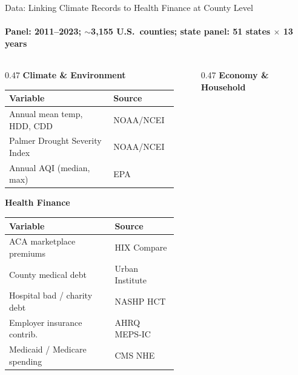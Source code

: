 \documentclass[aspectratio=169,11pt]{beamer}
\newcommand{\tealtext}[1]{{\color{Teal}#1}}
\begin{document}
\begin{frame}{Data: Linking Climate Records to Health Finance at County Level}
  \framesubtitle{Panel: 2011--2023; $\sim$3,155 U.S.\ counties; state panel: 51 states $\times$ 13 years}
  \begin{columns}[T]
    \begin{column}{0.47\textwidth}
      \textbf{\tealtext{Climate \& Environment}}\\[0.2em]
      \scriptsize
      \begin{tabular}{@{}>{\raggedright\arraybackslash}p{0.58\linewidth}>{\raggedright\arraybackslash}p{0.34\linewidth}@{}}
        \toprule
        Variable & Source \\
        \midrule
        Annual mean temp, HDD, CDD & NOAA/NCEI \\
        Palmer Drought Severity Index & NOAA/NCEI \\
        Annual AQI (median, max) & EPA \\
        \bottomrule
      \end{tabular}
      \vspace{0.4em}
      \textbf{\tealtext{Health Finance}}\\[0.2em]
      \begin{tabular}{@{}>{\raggedright\arraybackslash}p{0.58\linewidth}>{\raggedright\arraybackslash}p{0.34\linewidth}@{}}
        \toprule
        Variable & Source \\
        \midrule
        ACA marketplace premiums & HIX Compare \\
        County medical debt & Urban Institute \\
        Hospital bad / charity debt & NASHP HCT \\
        Employer insurance contrib. & AHRQ MEPS-IC \\
        Medicaid / Medicare spending & CMS NHE \\
        \bottomrule
      \end{tabular}
    \end{column}
    \begin{column}{0.47\textwidth}
      \textbf{\tealtext{Economy \& Household}}\\[0.2em]
      \scriptsize
      \begin{tabular}{@{}>{\raggedright\arraybackslash}p{0.58\linewidth}>{\raggedright\arraybackslash}p{0.34\linewidth}@{}}

\end{tabular}
\end{column}
\end{columns}
\end{frame}
\end{document}
